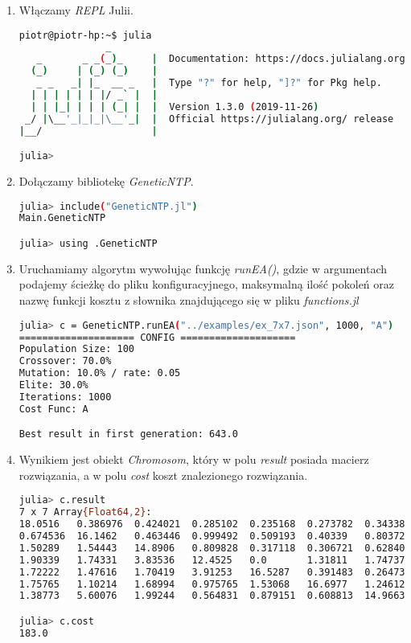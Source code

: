 \begin{enumerate}
    \item Włączamy \textit{REPL} Julii.
\begin{lstlisting}[language=bash, frame=single]
piotr@piotr-hp:~$ julia 
               _
   _       _ _(_)_     |  Documentation: https://docs.julialang.org
  (_)     | (_) (_)    |
   _ _   _| |_  __ _   |  Type "?" for help, "]?" for Pkg help.
  | | | | | | |/ _` |  |
  | | |_| | | | (_| |  |  Version 1.3.0 (2019-11-26)
 _/ |\__'_|_|_|\__'_|  |  Official https://julialang.org/ release
|__/                   |

julia> 

\end{lstlisting}

    \item Dołączamy bibliotekę \textit{GeneticNTP}.
\begin{lstlisting}[language=bash, frame=single]
julia> include("GeneticNTP.jl")
Main.GeneticNTP

julia> using .GeneticNTP
\end{lstlisting}

    \item Uruchamiamy algorytm wywołując funkcję \textit{runEA()}, gdzie w argumentach podajemy ścieżkę do pliku konfiguracyjnego, 
        maksymalną ilość pokoleń oraz nazwę funkcji kosztu z słownika znajdującego się w pliku \textit{functions.jl}
\begin{lstlisting}[language=bash, frame=single]
julia> c = GeneticNTP.runEA("../examples/ex_7x7.json", 1000, "A")
==================== CONFIG ====================
Population Size: 100
Crossover: 70.0%
Mutation: 10.0% / rate: 0.05
Elite: 30.0%
Iterations: 1000
Cost Func: A

Best result in first generation: 643.0    
\end{lstlisting}

    \item Wynikiem jest obiekt \textit{Chromosom}, który w polu \textit{result} posiada macierz rozwiązania, a w polu \textit{cost} koszt 
    znalezionego rozwiązania.
    
\begin{lstlisting}[language=bash, frame=single]
julia> c.result
7 x 7 Array{Float64,2}:
18.0516   0.386976  0.424021  0.285102  0.235168  0.273782  0.34338 
0.674536  16.1462   0.463446  0.999492  0.509193  0.40339   0.80372 
1.50289   1.54443   14.8906   0.809828  0.317118  0.306721  0.628409
1.90339   1.74331   3.83536   12.4525   0.0       1.31811   1.74737 
1.72222   1.47616   1.70419   3.91253   16.5287   0.391483  0.26473 
1.75765   1.10214   1.68994   0.975765  1.53068   16.6977   1.24612 
1.38773   5.60076   1.99244   0.564831  0.879151  0.608813  14.9663 

julia> c.cost
183.0

\end{lstlisting}

\end{enumerate}

